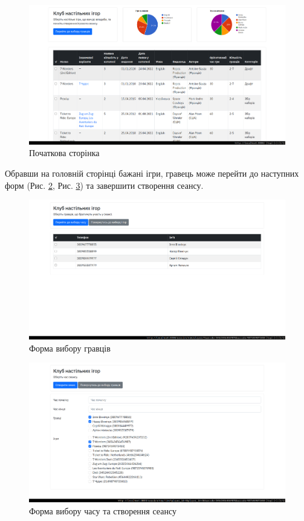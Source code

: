 \documentclass[a4paper, 14pt]{extarticle}
\begin{document}
  \begin{figure}[h]
    \includegraphics[width=\textwidth]{figures/index.png}
    \centering
    \caption{Початкова сторінка}
    \label{index}
  \end{figure}

  Обравши на головній сторінці бажані ігри, гравець може перейти до наступних форм
  (Рис. \ref{players}, Рис. \ref{time}) та завершити створення сеансу.

  \begin{figure}[h]
    \includegraphics[width=\textwidth]{figures/players.png}
    \centering
    \caption{Форма вибору гравців}
    \label{players}
  \end{figure}

  \begin{figure}[h]
    \includegraphics[width=\textwidth]{figures/time.png}
    \centering
    \caption{Форма вибору часу та створення сеансу}
    \label{time}
  \end{figure}
\end{document}
